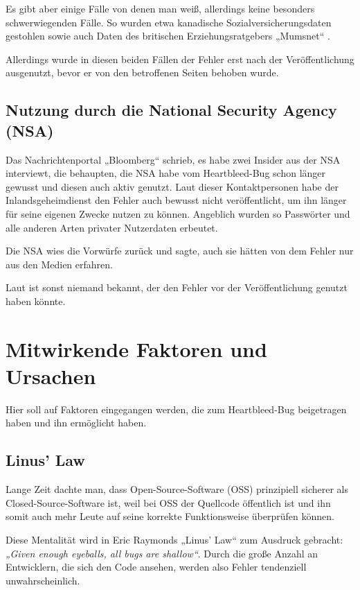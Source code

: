 \documentclass[12pt]{article}
\begin{document}
Es gibt aber einige Fälle von denen man weiß, allerdings keine besonders schwerwiegenden Fälle. So wurden etwa kanadische Sozialversicherungsdaten gestohlen \citep{bbc_first_2014} sowie auch Daten des britischen Erziehungsratgebers „Mumsnet“ \citep{kelion_heartbleed_2014}. 

Allerdings wurde in diesen beiden Fällen der Fehler erst nach der Veröffentlichung ausgenutzt, bevor er von den betroffenen Seiten behoben wurde. 

\subsection{Nutzung durch die National Security Agency (NSA)}

Das Nachrichtenportal „Bloomberg“ schrieb, es habe zwei Insider aus der NSA interviewt, die behaupten, die NSA habe vom Heartbleed-Bug schon länger gewusst und diesen auch aktiv genutzt. Laut dieser Kontaktpersonen habe der Inlandsgeheimdienst den Fehler auch bewusst nicht veröffentlicht, um ihn länger für seine eigenen Zwecke nutzen zu können. Angeblich wurden so Passwörter und alle anderen Arten privater Nutzerdaten erbeutet. \citep{riley_nsa_2014}

Die NSA wies die Vorwürfe zurück \citep{magid_nsa_2014} und sagte, auch sie hätten von dem Fehler nur aus den Medien erfahren. 

Laut \citet{riley_nsa_2014} ist sonst niemand bekannt, der den Fehler vor der Veröffentlichung genutzt haben könnte. 

\section{Mitwirkende Faktoren und Ursachen}

Hier soll auf Faktoren eingegangen werden, die zum Heartbleed-Bug beigetragen haben und ihn ermöglicht haben. 

\subsection{Linus' Law}

Lange Zeit dachte man, dass Open-Source-Software (OSS) prinzipiell sicherer als Closed-Source-Software ist, weil bei OSS der Quellcode öffentlich ist und ihn somit auch mehr Leute auf seine korrekte Funktionsweise überprüfen können. 

Diese Mentalität wird in Eric Raymonds „Linus' Law“ zum Ausdruck gebracht: \textit{„Given enough eyeballs, all bugs are shallow“}. Durch die große Anzahl an Entwicklern, die sich den Code ansehen, werden also Fehler tendenziell unwahrscheinlich. 
\end{document}
